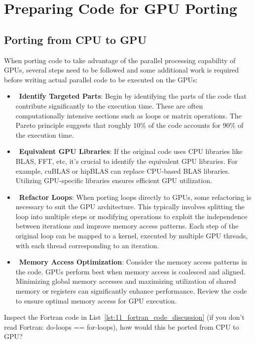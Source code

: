\section{Preparing Code for GPU Porting}\label{sec:porting_code}


\subsection{Porting from CPU to GPU}


\par
When porting code to take advantage of the parallel processing capability of GPUs, several steps need to be followed and some additional work is required before writing actual parallel code to be executed on the GPUs:
\begin{itemize}
    \item~\textbf{Identify Targeted Parts}: Begin by identifying the parts of the code that contribute significantly to the execution time. These are often computationally intensive sections such as loops or matrix operations. The Pareto principle suggests that roughly 10\% of the code accounts for 90\% of the execution time.
    \item~\textbf{Equivalent GPU Libraries}: If the original code uses CPU libraries like BLAS, FFT, etc, it’s crucial to identify the equivalent GPU libraries. For example, cuBLAS or hipBLAS can replace CPU-based BLAS libraries. Utilizing GPU-specific libraries ensures efficient GPU utilization.
    \item~\textbf{Refactor Loops}: When porting loops directly to GPUs, some refactoring is necessary to suit the GPU architecture. This typically involves splitting the loop into multiple steps or modifying operations to exploit the independence between iterations and improve memory access patterns. Each step of the original loop can be mapped to a kernel, executed by multiple GPU threads, with each thread corresponding to an iteration.
    \item~\textbf{Memory Access Optimization}: Consider the memory access patterns in the code. GPUs perform best when memory access is coalesced and aligned. Minimizing global memory accesses and maximizing utilization of shared memory or registers can significantly enhance performance. Review the code to ensure optimal memory access for GPU execution.
\end{itemize}


\par
Inspect the Fortran code in List~\ref{lst:11_fortran_code_discussion} (if you don’t read Fortran: do-loops == for-loops), how would this be ported from CPU to GPU?


